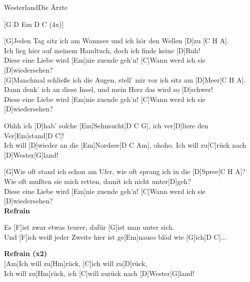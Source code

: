 \begin{song}{Westerland}{Die Ärzte}
    \begin{guitarMagic}

        [G D Em D C (4x)]
        
        [G]Jeden Tag sitz ich am Wannsee und ich hör den Wellen [D]zu [C H A]. \\
        [G]Ich lieg hier auf meinem Handtuch, doch ich finde keine [D]Ruh! \\
        [C]Diese eine Liebe wird [Em]nie zuende geh'n! [C]Wann werd ich sie [D]wiedersehen? \\
        
        [G]Manchmal schließe ich die Augen, stell' mir vor ich sitz am [D]Meer[C H A]. \\
        [G]Dann denk' ich an diese Insel, und mein Herz das wird so [D]schwer! \\
        [C]Diese eine Liebe wird [Em]nie zuende geh'n! [C]Wann werd ich sie [D]wiedersehen? 
        \begin{chorus}
            [G]Ohhh ich [D]hab' solche [Em]Sehnsucht[D C G], 
            \hspace{1em}ich ver[D]liere den Ver[Em]stand[D C]! \\
            [G]Ich will [D]wieder an die [Em]Nordsee[D C Am], \hspace{1.5 em}ohoho. 
            Ich will zu[C]rück nach [D]Wester[G]land!
        \end{chorus}
        [G]Wie oft stand ich schon am Ufer, wie oft sprang ich in die [D]Spree[C H A]? \\
        [G]Wie oft mußten sie mich retten, damit ich nicht unter[D]geh? \\
        [C]Diese eine Liebe wird [Em]nie zuende geh'n! [C]Wann werd ich sie [D]wiedersehen? \\
        
        \textbf{Refrain}
        
        \begin{bridge}
         Es [F]ist zwar etwas teurer, dafür [G]ist man unter sich. \\
        Und [F]ich weiß jeder Zweite hier ist ge[Em]nauso blöd wie [G]ich[D C]... \\
        \end{bridge}
        
        \textbf{Refrain (x2)} \\
        
        [Am]Ich will zu[Hm]rück, [C]ich will zu[D]rück,\\
        [Am]Ich will zu[Hm]rück, ich [C]will zurück nach [D]Wester[G]land!\\

    \end{guitarMagic}
\end{song}
